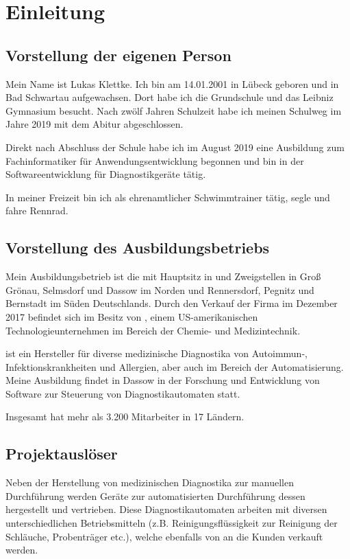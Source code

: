 \section{Einleitung}
\label{sec:Einleitung}

\subsection{Vorstellung der eigenen Person} 
\label{sec:eigene Person}
Mein Name ist Lukas Klettke. Ich bin am 14.01.2001 in Lübeck geboren und in Bad Schwartau aufgewachsen. Dort habe ich die Grundschule und das Leibniz Gymnasium besucht. Nach zwölf Jahren Schulzeit habe ich meinen Schulweg im Jahre 2019 mit dem Abitur abgeschlossen.

Direkt nach Abschluss der Schule habe ich im August 2019 eine Ausbildung zum Fachinformatiker für Anwendungsentwicklung begonnen und bin in der Softwareentwicklung für Diagnostikgeräte tätig.

In meiner Freizeit bin ich als ehrenamtlicher Schwimmtrainer tätig, segle und fahre Rennrad.

\subsection{Vorstellung des Ausbildungsbetriebs} 
\label{sec:Ausbildungsbetrieb}
Mein Ausbildungsbetrieb ist die {\betriebName} mit Hauptsitz in {\betriebOrt} und Zweigstellen in Groß Grönau, Selmsdorf und Dassow im Norden und Rennersdorf, Pegnitz und Bernstadt im Süden Deutschlands. Durch den Verkauf der Firma im Dezember 2017 befindet sich {\betriebNameKzf} im Besitz von {\mutterBetriebName}, einem US-amerikanischen Technologieunternehmen im Bereich der Chemie- und Medizintechnik.

{\betriebNameKzf} ist ein Hersteller für diverse medizinische Diagnostika von Autoimmun-, Infektionskrankheiten und Allergien, aber auch im Bereich der Automatisierung. Meine Ausbildung findet in Dassow in der Forschung und Entwicklung von Software zur Steuerung von Diagnostikautomaten statt.

Insgesamt hat {\betriebNameKzf} mehr als 3.200 Mitarbeiter in 17 Ländern.

\subsection{Projektauslöser} 
\label{sec:Projektauslöser}
Neben der Herstellung von medizinischen Diagnostika zur manuellen Durchführung werden Geräte zur automatisierten Durchführung dessen hergestellt und vertrieben. Diese Diagnostikautomaten arbeiten mit diversen unterschiedlichen Betriebsmitteln (z.B. Reinigungsflüssigkeit zur Reinigung der Schläuche, Probenträger etc.), welche ebenfalls von {\betriebNameKzf} an die Kunden verkauft werden.

